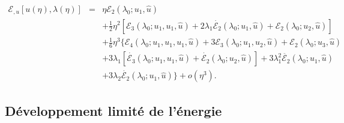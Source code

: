 \documentclass{article}
\newcommand{\nosymbol}{}
\begin{document}
\begin{eqnarray}
  \mathcal{E}_{, u} [u (\eta), \lambda (\eta)] & = & \eta \mathcal{E}_2
  (\lambda_0 ; u_1, \hat{u}) \nonumber\\
  &  & \nosymbol + \tfrac{1}{2} \eta^2  [\mathcal{E}_3 (\lambda_0 ; u_1, u_1,
  \hat{u}) + 2 \lambda_1  \dot{\mathcal{E}_2} (\lambda_0 ; u_1, \hat{u})
  +\mathcal{E}_2 (\lambda_0 ; u_2, \hat{u})] \nonumber\\
  &  & \nosymbol + \tfrac{1}{6} \eta^3  \{ \mathcal{E}_4 (\lambda_0 ; u_1,
  u_1, u_1, \hat{u}) + 3\mathcal{E}_3 (\lambda_0 ; u_1, u_2, \hat{u})
   +\mathcal{E}_2 (\lambda_0 ; u_3, \hat{u}) \nonumber\\
  &  & \nosymbol + 3 \lambda_1  [\dot{\mathcal{E}_3} (\lambda_0 ; u_1, u_1,
  \hat{u}) + \dot{\mathcal{E}_2} (\lambda_0 ; u_2, \hat{u})] + 3 \lambda_1^2
  \ddot{\mathcal{E}_2} (\lambda_0 ; u_1, \hat{u}) \nonumber\\
  &  &  \nosymbol + 3 \lambda_2  \dot{\mathcal{E}_2} (\lambda_0 ;
  u_1, \hat{u}) \} + o (\eta^3) .  \label{eq20220107080901}
\end{eqnarray}
\subsection{Développement limité de l'énergie}\label{sec:DL
energie}
\end{document}
